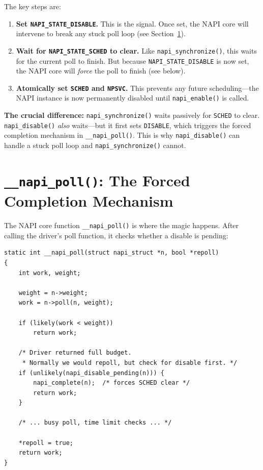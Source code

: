 \documentclass[11pt,a4paper,openany]{book}
\newcommand{\func}[1]{\texttt{#1()}}
\newcommand{\flag}[1]{\texttt{#1}}
\begin{document}
The key steps are:

\begin{enumerate}
\item \textbf{Set \flag{NAPI\_STATE\_DISABLE}.}  This is the signal.
    Once set, the NAPI core will intervene to break any stuck poll loop
    (see Section~\ref{sec:napi-poll-check}).
\item \textbf{Wait for \flag{NAPI\_STATE\_SCHED} to clear.}  Like
    \func{napi\_synchronize}, this waits for the current poll to finish.
    But because \flag{NAPI\_STATE\_DISABLE} is now set, the NAPI core
    will \emph{force} the poll to finish (see below).
\item \textbf{Atomically set \flag{SCHED} and \flag{NPSVC}.}  This
    prevents any future scheduling---the NAPI instance is now
    permanently disabled until \func{napi\_enable} is called.
\end{enumerate}

\textbf{The crucial difference:} \func{napi\_synchronize} waits
passively for \flag{SCHED} to clear.  \func{napi\_disable} \emph{also}
waits---but it first sets \flag{DISABLE}, which triggers the forced
completion mechanism in \func{\_\_napi\_poll}.  This is why
\func{napi\_disable} can handle a stuck poll loop and
\func{napi\_synchronize} cannot.

\section{\texttt{\_\_napi\_poll()}: The Forced Completion Mechanism}
\label{sec:napi-poll-check}

The NAPI core function \func{\_\_napi\_poll} is where the magic happens.
After calling the driver's poll function, it checks whether a disable
is pending:

\begin{lstlisting}[caption={\texttt{\_\_napi\_poll()} forced completion (net/core/dev.c)},
    label=lst:napi-poll-check]
static int __napi_poll(struct napi_struct *n, bool *repoll)
{
    int work, weight;

    weight = n->weight;
    work = n->poll(n, weight);

    if (likely(work < weight))
        return work;

    /* Driver returned full budget.
     * Normally we would repoll, but check for disable first. */
    if (unlikely(napi_disable_pending(n))) {
        napi_complete(n);  /* forces SCHED clear */
        return work;
    }

    /* ... busy poll, time limit checks ... */

    *repoll = true;
    return work;
}
\end{lstlisting}
\end{document}
